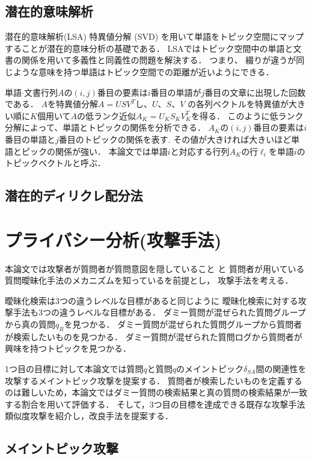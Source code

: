 \documentclass[master]{suribt}
\theoremstyle{definition}
\begin{document}
 \section{潜在的意味解析}
 潜在的意味解析(LSA)
 特異値分解 (SVD) を用いて単語をトピック空間にマップすることが潜在的意味分析の基礎である．
 LSAではトピック空間中の単語と文書の関係を用いて多義性と同義性の問題を解決する．
 つまり、 綴りが違うが同じような意味を持つ単語はトピック空間での距離が近いようにできる．

 単語$\cdot$文書行列$A$の$(i,j)$番目の要素は$i$番目の単語が$j$番目の文章に出現した回数である．
 $A$を特異値分解$A = USV^T$し、$U$、$S$、$V$ の各列ベクトルを特異値が大きい順に$K$個用いて$A$の低ランク近似$A_K=U_KS_KV_{K}^T$を得る．
 このように低ランク分解によって、単語とトピックの関係を分析できる．
 $A_K$の$(i,j)$番目の要素は$i$番目の単語と$j$番目のトピックの関係を表す.
 その値が大きければ大きいほど単語とピックの関係が強い．
 本論文では単語$i$と対応する行列$A_K$の行$\ell_i$を単語$i$のトピックベクトルと呼ぶ．


 \section{潜在的ディリクレ配分法}

 \chapter{プライバシー分析(攻撃手法)}
 本論文では攻撃者が質問者が質問意図を隠していること
 と
 質問者が用いている質問曖昧化手法のメカニズムを知っているを前提とし，
 攻撃手法を考える．

 曖昧化検索は3つの違うレベルな目標があると同じように
 曖昧化検索に対する攻撃手法も3つの違うレベルな目標がある．
 ダミー質問が混ぜられた質問グループから真の質問$q_R$を見つかる．
 ダミー質問が混ぜられた質問グループから質問者が検索したいものを見つかる．
 ダミー質問が混ぜられた質問ログから質問者が興味を持つトピックを見つかる．

 1つ目の目標に対して本論文では質問$q$と質問$q$のメイントピック$\delta_{SA}$間の関連性を攻撃するメイントピック攻撃を提案する．
 質問者が検索したいものを定義するのは難しいため，本論文ではダミー質問の検索結果と真の質問の検索結果が一致する割合を用いて評価する．
 そして，3つ目の目標を達成できる既存な攻撃手法類似度攻撃\cite{simattack2016}を紹介し，改良手法を提案する．

 \section{メイントピック攻撃}
\end{document}
